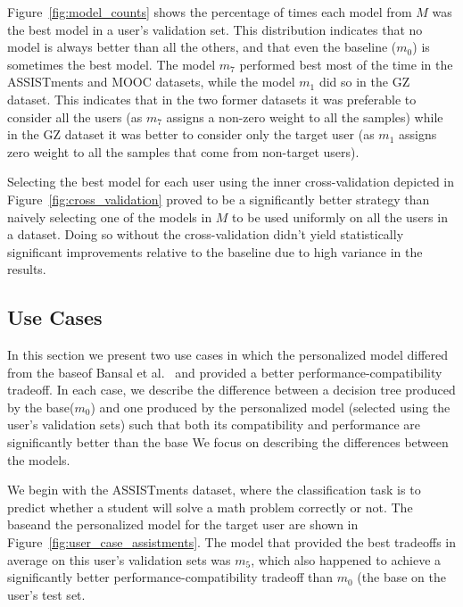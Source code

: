 \documentclass[letterpaper]{article} %
\theoremstyle{definition}
\begin{document}
Figure~\ref{fig:model_counts} shows the percentage of times each model from $M$ was the best model in a user's validation set. This distribution indicates that no model is always better than all the others, and that even the baseline ($m_0$) is sometimes the best model.
%
The model $m_7$ performed best most of the time in the ASSISTments and MOOC datasets, while the model $m_1$ did so in the GZ dataset. This indicates that in the two former datasets it was preferable to consider all the users (as $m_7$ assigns a non-zero weight to all the samples) while in the GZ dataset it was better to consider only the target user (as $m_1$ assigns zero weight to all the samples that come from non-target users).

Selecting the best model for each user using the inner cross-validation depicted in Figure~\ref{fig:cross_validation} proved to be a significantly better strategy than naively selecting one of the models in $M$ to be used uniformly on all the users in a dataset. Doing so without the cross-validation didn't yield statistically significant improvements relative to the baseline due to high variance in the results.

\subsection{Use Cases}
\label{sec:user_cases}
%
In this section we present two use cases in which the personalized model differed from the baseof Bansal et al.~ and provided a better performance-compatibility tradeoff.
In each case, we describe the difference between a decision tree produced by the base($m_0$) and one produced by the personalized model (selected using the user's validation sets) such that both its compatibility and performance are significantly better than the base
We focus on describing the differences between the models.

We begin with the ASSISTments dataset, where the classification task is to predict whether a student will solve a math problem correctly or not.  The baseand the personalized model for the target user are shown in Figure~\ref{fig:user_case_assistments}.
The model that provided the best tradeoffs in average on this user's validation sets was $m_5$, which also happened to achieve a significantly better performance-compatibility tradeoff than $m_0$ (the base on the user's test set.
\end{document}
